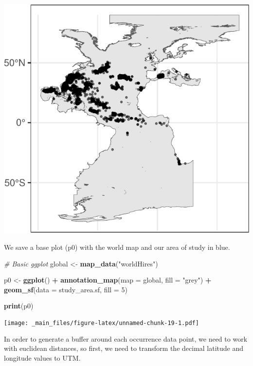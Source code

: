 \documentclass[
]{book}
\newenvironment{Shaded}{\begin{snugshade}}{\end{snugshade}}
\newcommand{\AttributeTok}[1]{\textcolor[rgb]{0.13,0.29,0.53}{#1}}
\newcommand{\CommentTok}[1]{\textcolor[rgb]{0.56,0.35,0.01}{\textit{#1}}}
\newcommand{\DecValTok}[1]{\textcolor[rgb]{0.00,0.00,0.81}{#1}}
\newcommand{\FunctionTok}[1]{\textcolor[rgb]{0.13,0.29,0.53}{\textbf{#1}}}
\newcommand{\NormalTok}[1]{#1}
\newcommand{\OtherTok}[1]{\textcolor[rgb]{0.56,0.35,0.01}{#1}}
\newcommand{\SpecialCharTok}[1]{\textcolor[rgb]{0.81,0.36,0.00}{\textbf{#1}}}
\newcommand{\StringTok}[1]{\textcolor[rgb]{0.31,0.60,0.02}{#1}}
\begin{document}
\includegraphics{_main_files/figure-latex/unnamed-chunk-18-1.pdf}

We save a base plot (p0) with the world map and our area of study in blue.

\begin{Shaded}
\begin{Highlighting}[]
\CommentTok{\# Basic ggplot}
\NormalTok{global }\OtherTok{\textless{}{-}} \FunctionTok{map\_data}\NormalTok{(}\StringTok{"worldHires"}\NormalTok{)}

\NormalTok{p0 }\OtherTok{\textless{}{-}} \FunctionTok{ggplot}\NormalTok{() }\SpecialCharTok{+} \FunctionTok{annotation\_map}\NormalTok{(}\AttributeTok{map =}\NormalTok{ global,}
    \AttributeTok{fill =} \StringTok{"grey"}\NormalTok{) }\SpecialCharTok{+} \FunctionTok{geom\_sf}\NormalTok{(}\AttributeTok{data =}\NormalTok{ study\_area.sf,}
    \AttributeTok{fill =} \DecValTok{5}\NormalTok{)}

\FunctionTok{print}\NormalTok{(p0)}
\end{Highlighting}
\end{Shaded}

\texttt{[image: \_main\_files/figure-latex/unnamed-chunk-19-1.pdf]}

In order to generate a buffer around each occurrence data point, we need to work with euclidean distances, so first, we need to transform the decimal latitude and longitude values to UTM.
\end{document}
